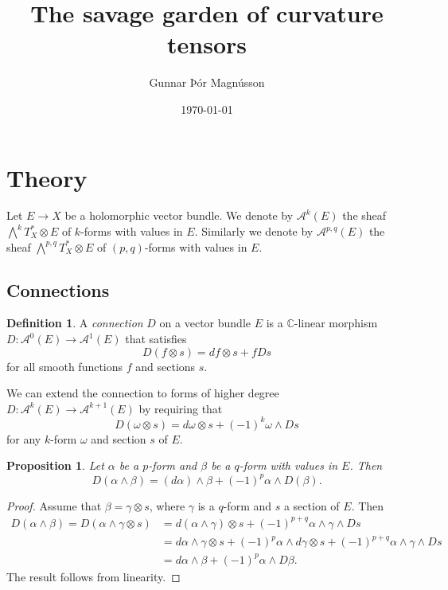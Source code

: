 \documentclass[11pt]{article}
\author{Gunnar Þór Magnússon}
\date{\today}
\title{The savage garden of curvature tensors}
\newtheorem{prop}[theo]{Proposition}
\theoremstyle{definition}
\newtheorem{defi}[theo]{Definition}
\newcommand{\kk}[1]{\mathbb{#1}}
\newcommand{\cc}[1]{\mathcal{#1}}
\begin{document}
\maketitle
\tableofcontents


\section{Theory}
\label{sec:org093d592}

Let $E \to X$ be a holomorphic vector bundle. We denote by $\cc A^k(E)$ the sheaf $\bigwedge^k T_X^* \otimes E$ of $k$-forms with values in $E$. Similarly we denote by $\cc A^{p,q}(E)$ the sheaf $\bigwedge^{p,q} T_X^* \otimes E$ of $(p,q)$-forms with values in $E$.


\subsection{Connections}

\begin{defi}
A \emph{connection} $D$ on a vector bundle $E$ is a $\kk C$-linear morphism $D : \cc A^0(E) \to \cc A^1(E)$ that satisfies
$$
D(f \otimes s) = df \otimes s + f Ds
$$
for all smooth functions $f$ and sections $s$.
\end{defi}

We can extend the connection to forms of higher degree $D : \cc A^k(E) \to \cc A^{k+1}(E)$ by requiring that
$$
D(\omega \otimes s) = d \omega \otimes s + (-1)^{k} \omega \wedge D s
$$
for any $k$-form $\omega$ and section $s$ of $E$.


\begin{prop}
  Let $\alpha$ be a $p$-form and $\beta$ be a $q$-form with values in $E$. Then
$$
D(\alpha \wedge \beta)
= (d\alpha) \wedge \beta
+ (-1)^p \alpha \wedge D(\beta).
$$
\end{prop}

\begin{proof}
Assume that $\beta = \gamma \otimes s$, where $\gamma$ is a $q$-form and $s$ a section of $E$. Then
\begin{align*}
D(\alpha \wedge \beta)
= D(\alpha \wedge \gamma \otimes s)
&= d(\alpha \wedge \gamma) \otimes s
+ (-1)^{p+q} \alpha \wedge \gamma \wedge Ds
\\
&= d\alpha \wedge \gamma \otimes s
+ (-1)^p \alpha \wedge d\gamma \otimes s
+ (-1)^{p+q} \alpha \wedge \gamma \wedge Ds
\\
&=
d\alpha \wedge \beta
+ (-1)^p \alpha \wedge D\beta.
\end{align*}
The result follows from linearity.
\end{proof}
\end{document}
